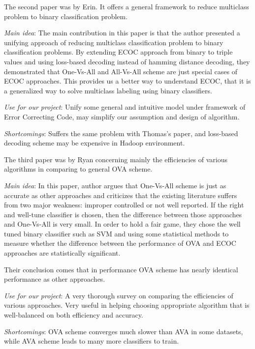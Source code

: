 The second paper was by Erin. It offers a general framework to reduce multiclass problem to binary classification problem.\cite{Erin2000}
\begin{itemize*}
\item {\em Main idea}: The main contribution in this paper is that the author presented a unifying approach of reducing multiclass classification problem to binary classification problems. By extending ECOC approach from binary to triple values and using loss-based decoding instead of hamming distance decoding, they demonstrated that One-Vs-All and All-Vs-All scheme are just special cases of ECOC approaches. This provides us a better way to understand ECOC, that it is a generalized way to solve multiclass labeling using binary classifiers.
\item {\em Use for our project}: Unify some general and intuitive model under framework of Error Correcting Code, may simplify our assumption and design of algorithm.
\item {\em Shortcomings}:
Suffers the same problem with Thomas's paper, and loss-based decoding scheme may be expensive in Hadoop environment.
\end{itemize*}

The third paper was by Ryan concerning mainly the efficiencies of various algorithms in comparing to general OVA scheme.\cite{Ryan2000}
\begin{itemize*}
\item {\em Main idea}: In this paper, author argues that One-Vs-All scheme is just as accurate as other approaches and criticizes that the existing literature suffers from two major weakness: improper controlled or not well reported. If the right and well-tune classifier is chosen, then the difference between those approaches and One-Vs-All is very small.
In order to hold a fair game, they chose the well tuned binary classifier such as SVM and using some statistical methods to measure whether the difference between the performance of OVA and ECOC approaches are statistically significant.

Their conclusion comes that in performance OVA scheme has nearly identical performance as other approaches.
\item {\em Use for our project}: A very thorough survey on comparing the efficiencies of various approaches. Very useful in helping choosing appropriate algorithm that is well-balanced on both efficiency and accuracy.
\item {\em Shortcomings}:
OVA scheme converges much slower than AVA in some datasets, while AVA scheme leads to many more classifiers to train.
\end{itemize*}


